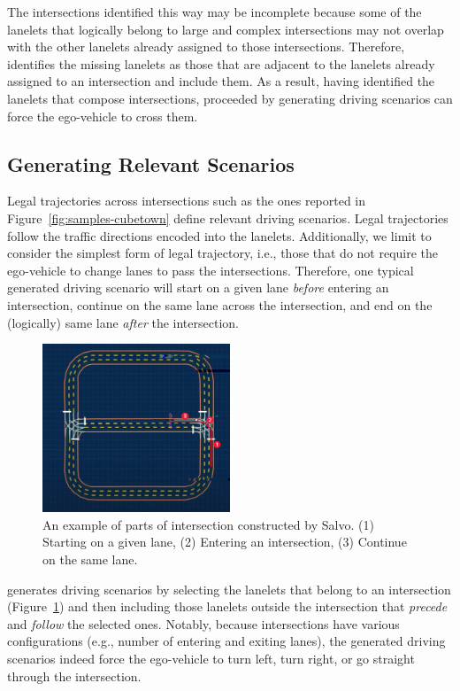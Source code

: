 \documentclass[conference]{IEEEtran}
\begin{document}
The intersections identified this way may be incomplete because some of the lanelets that logically belong to large and complex intersections may not overlap with the other lanelets already assigned to those intersections. Therefore, \tool identifies the missing lanelets as those that are adjacent to the lanelets already assigned to an intersection and include them. As a result, having identified the lanelets that compose intersections, \tool proceeded by generating driving scenarios can force the ego-vehicle to cross them.

\subsection{Generating Relevant Scenarios}
Legal trajectories across intersections such as the ones reported in Figure~\ref{fig:samples-cubetown} define relevant driving scenarios. Legal trajectories follow the traffic directions encoded into the lanelets. Additionally, we limit \tool to consider the simplest form of legal trajectory, i.e., those that do not require the ego-vehicle to change lanes to pass the intersections. Therefore, one typical generated driving scenario will start on a given lane \emph{before} entering an intersection, continue on the same lane across the intersection, and end on the (logically) same lane \emph{after} the intersection.
%
\begin{figure}[H]
  \centering
    \includegraphics[width=0.5\textwidth]{images/lanelet01}
  \caption{An example of parts of intersection constructed by Salvo. (1) Starting on a given lane, (2) Entering an intersection, (3) Continue on the same lane.}
  \label{fig:intersection_sf}
\end{figure}

\tool generates driving scenarios by selecting the lanelets that belong to an intersection (Figure~\ref{fig:intersection_sf}) and then including those lanelets outside the intersection that \emph{precede} and \emph{follow} the selected ones. Notably, because intersections have various configurations (e.g., number of entering and exiting lanes), the generated driving scenarios indeed force the ego-vehicle to turn left, turn right, or go straight through the intersection.
\end{document}
